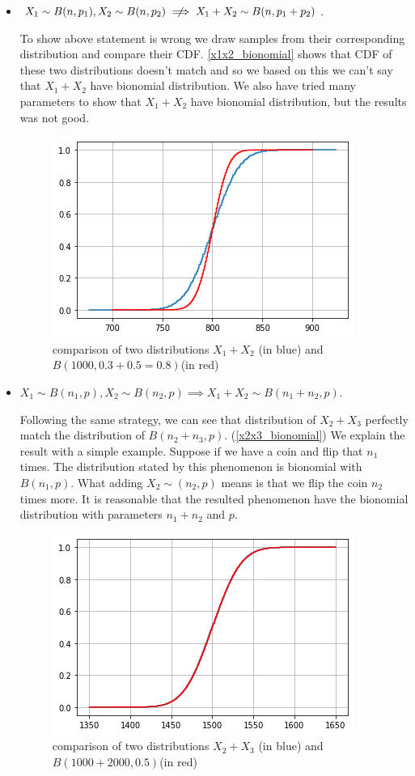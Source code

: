 \documentclass[12pt, a4paper]{book}
\begin{document}
\begin{itemize}
    \item $X_1 \sim B(n, p_1), X_2 \sim B(n, p_2) \centernot\implies X_1+X_2 \sim B(n, p_1+p_2)$.

    To show above statement is wrong we draw samples from their corresponding distribution and
    compare their CDF. \autoref{x1x2_bionomial} shows that CDF of these two distributions
    doesn't match and so we based on this we can't say that $X_1+X_2$ have bionomial distribution.
    We also have tried many parameters to show that $X_1+X_2$ have bionomial distribution, but
    the results was not good.

    \begin{figure}[h]
        \centering
        \includegraphics[width=0.6\linewidth]{images/question9/x1x2.png}
        \caption{comparison of two distributions $X_1+X_2$ (in blue) and $B(1000, 0.3+0.5=0.8)$(in red)}
        \label{x1x2_bionomial}
    \end{figure}

    \item $X_1 \sim B(n_1, p), X_2 \sim B(n_2, p) \implies X_1+X_2 \sim B(n_1+n_2, p)$.

    Following the same strategy, we can see that distribution of $X_2+X_3$ perfectly match the
    distribution of $B(n_2+n_3, p)$. (\autoref{x2x3_bionomial}) We explain the result with a simple example.
    Suppose if we have a coin and flip that $n_1$ times. The distribution stated by this phenomenon
    is bionomial with $B(n_1, p)$. What adding $X_2 \sim (n_2, p)$ means is that we flip the coin $n_2$ times more.
    It is reasonable that the resulted phenomenon have the bionomial distribution with parameters $n_1+n_2$ and $p$.

    \begin{figure}[h]
        \centering
        \includegraphics[width=0.6\linewidth]{images/question9/x2x3.png}
        \caption{comparison of two distributions $X_2+X_3$ (in blue) and $B(1000+2000, 0.5)$(in red)}
        \label{x2x3_bionomial}
    \end{figure}

\end{itemize}
\end{document}
